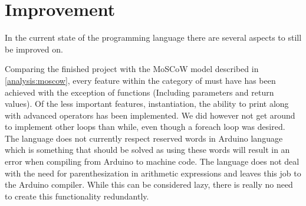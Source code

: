 \section{Improvement}\label{discussion:improvements}
In the current state of the programming language there are several aspects to still be improved on.

Comparing the finished project with the MoSCoW model described in \ref{analysis:moscow}, every feature within the category of must have has been achieved with the exception of functions (Including parameters and return values). Of the less important features, instantiation, the ability to print along with advanced operators has been implemented. We did however not get around to implement other loops than while, even though a foreach loop was desired. \\

The language does not currently respect reserved words in Arduino language which is something that should be solved as using these words will result in an error when compiling from Arduino to machine code. The language does not deal with the need for parenthesization in arithmetic expressions and leaves this job to the Arduino compiler. While this can be considered lazy, there is really no need to create this functionality redundantly. \\ 